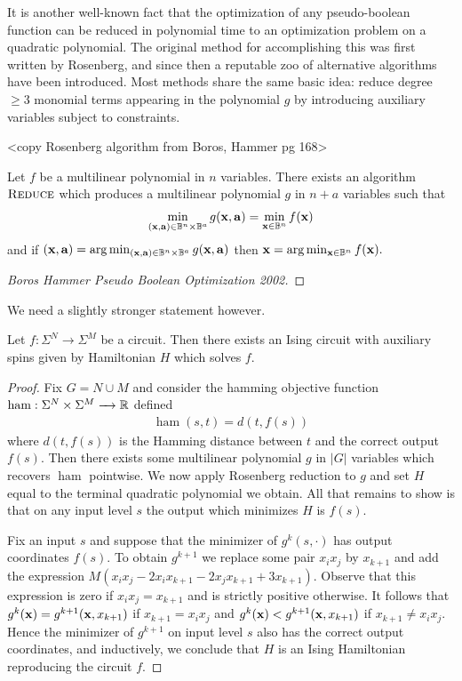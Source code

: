 \documentclass{article}
\begin{document}
It is another well-known fact that the optimization of any pseudo-boolean function can be reduced in polynomial time to an optimization problem on a quadratic polynomial. The original method for accomplishing this was first written by Rosenberg, and since then a reputable zoo of alternative algorithms have been introduced. Most methods share the same basic idea: reduce degree $\geq 3$ monomial terms appearing in the polynomial $g$ by introducing auxiliary variables subject to constraints.

<copy Rosenberg algorithm from Boros, Hammer pg 168>

\begin{thm}\label{thm:rosenberg-reduction}
  Let $f$ be a multilinear polynomial in $n$ variables. There exists an algorithm $\textsc{Reduce}$ which produces a multilinear polynomial $g$ in $n + a$ variables such that
  \begin{align*}
    \min_{(\bfx, \bfa) \in \bB^n \times \bB^a} g(\bfx, \bfa) = \min_{\bfx \in \bB^n} f(\bfx)
  \end{align*}
  and if $(\bfx, \bfa) = \arg\min_{(\bfx, \bfa) \in \bB^n \times \bB^a} g(\bfx, \bfa)$ then $\bfx = \arg\min_{\bfx \in \bB^n} f(\bfx).$
\end{thm}
\begin{proof}
  [Boros Hammer Pseudo Boolean Optimization 2002]
\end{proof}
We need a slightly stronger statement however.
\begin{thm}
  Let $f:\Sigma^N \to \Sigma^M$ be a circuit. Then there exists an Ising circuit with auxiliary spins given by Hamiltonian $H$ which solves $f$.
\end{thm}
\begin{proof}
  Fix $G = N \cup M$ and consider the hamming objective function $\operatorname{ham}:\Sigma^N\times \Sigma^M\to \bR$ defined
  \begin{align*}
    \operatorname{ham}(s,t) = d(t, f(s))
  \end{align*}
  where $d(t, f(s))$ is the Hamming distance between $t$ and the correct output $f(s)$. Then there exists some multilinear polynomial $g$ in $|G|$ variables which recovers $\operatorname{ham}$ pointwise. We now apply Rosenberg reduction to $g$ and set $H$ equal to the terminal quadratic polynomial we obtain. All that remains to show is that on any input level $s$ the output which minimizes $H$ is $f(s)$.

  Fix an input $s$ and suppose that the minimizer of $g^k(s, \cdot)$ has output coordinates $f(s)$. To obtain $g^{k+1}$ we replace some pair $x_ix_j$ by $x_{k+1}$ and add the expression $M(x_ix_j - 2x_ix_{k+1} - 2x_jx_{k+1} + 3x_{k+1})$. Observe that this expression is zero if $x_ix_j = x_{k+1}$ and is strictly positive otherwise. It follows that $g^k(\mathbf{x}) = g^{k+1}(\mathbf{x}, x_{k+1})$ if $x_{k+1} = x_ix_j$ and $g^k(\mathbf{x}) < g^{k+1}(\mathbf{x}, x_{k+1})$ if $x_{k+1} \neq x_ix_j$. Hence the minimizer of $g^{k+1}$ on input level $s$ also has the correct output coordinates, and inductively, we conclude that $H$ is an Ising Hamiltonian reproducing the circuit $f$.
\end{proof}
\newpage


\end{document}
